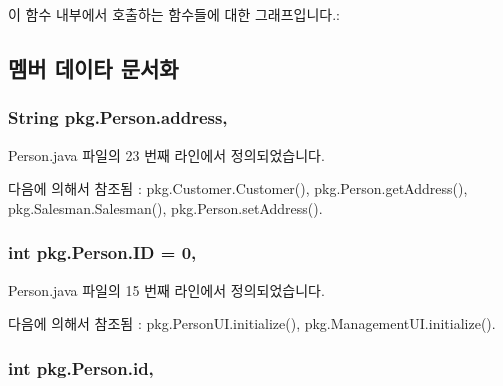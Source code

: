이 함수 내부에서 호출하는 함수들에 대한 그래프입니다.\+:




\subsection{멤버 데이타 문서화}
\subsubsection[{\texorpdfstring{address}{address}}]{\setlength{\rightskip}{0pt plus 5cm}String pkg.\+Person.\+address\hspace{0.3cm}{\ttfamily [protected]}, {\ttfamily [inherited]}}\hypertarget{classpkg_1_1_person_a692aadebf7edf808fbcbacbcaed07ef3}{}\label{classpkg_1_1_person_a692aadebf7edf808fbcbacbcaed07ef3}


Person.\+java 파일의 23 번째 라인에서 정의되었습니다.



다음에 의해서 참조됨 \+:  pkg.\+Customer.\+Customer(), pkg.\+Person.\+get\+Address(), pkg.\+Salesman.\+Salesman(), pkg.\+Person.\+set\+Address().

\subsubsection[{\texorpdfstring{ID}{ID}}]{\setlength{\rightskip}{0pt plus 5cm}int pkg.\+Person.\+ID = 0\hspace{0.3cm}{\ttfamily [static]}, {\ttfamily [inherited]}}\hypertarget{classpkg_1_1_person_af93c4dddd917c1fd77adc3eb68af3e54}{}\label{classpkg_1_1_person_af93c4dddd917c1fd77adc3eb68af3e54}


Person.\+java 파일의 15 번째 라인에서 정의되었습니다.



다음에 의해서 참조됨 \+:  pkg.\+Person\+U\+I.\+initialize(), pkg.\+Management\+U\+I.\+initialize().

\subsubsection[{\texorpdfstring{id}{id}}]{\setlength{\rightskip}{0pt plus 5cm}int pkg.\+Person.\+id\hspace{0.3cm}{\ttfamily [protected]}, {\ttfamily [inherited]}}\hypertarget{classpkg_1_1_person_acd3bca96258af32adc1eca89b74222a6}{}\label{classpkg_1_1_person_acd3bca96258af32adc1eca89b74222a6}


